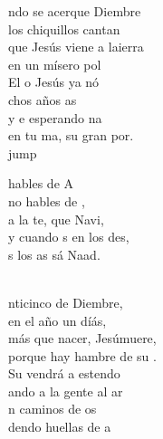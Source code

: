 \begin{cancion}%
	ndo se acerque Diembre\\
	los chiquillos cantan\\
	que Jesús viene a laierra\\
	en un mísero pol\\
	El o Jesús ya nó\\
	chos años as\\
	y e esperando na\\
	en tu ma, su gran por.\\jump\\
	\begin{chorus}%
	hables de A\\
	no hables de ,\\
	a la te, que  Navi,\\
	y cuando s en los des,\\
	s los as sá Naad.\\
	\end{chorus}%
	\jump\\
	nticinco de Diembre,\\
	en el año un díás,\\
	más que nacer, Jesúmuere,\\
	porque hay hambre de su .\\
	Su vendrá a estendo\\
	ando a la gente al ar \\
	n caminos de os\\
	dendo huellas de a\\
\end{cancion}%
